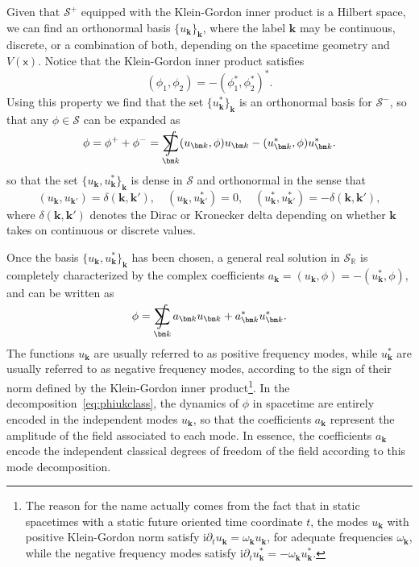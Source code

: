 \documentclass[letterpaper,12pt,titlepage,oneside,final]{book}
\renewcommand{\S}{\mathcal{S}}
\newcommand{\mf}{\mathsf}%
\newcommand{\ii}{\mathrm{i}}
\DeclareMathOperator*{\sumint}{%
\mathchoice%
  {\ooalign{$\displaystyle\sum$\cr\hidewidth$\displaystyle\int$\hidewidth\cr}}
  {\ooalign{\raisebox{.14\height}{\scalebox{.7}{$\textstyle\sum$}}\cr\hidewidth$\textstyle\int$\hidewidth\cr}}
  {\ooalign{\raisebox{.2\height}{\scalebox{.6}{$\scriptstyle\sum$}}\cr$\scriptstyle\int$\cr}}
  {\ooalign{\raisebox{.2\height}{\scalebox{.6}{$\scriptstyle\sum$}}\cr$\scriptstyle\int$\cr}}
}
\begin{document}
Given that $\mathcal{S}^+$ equipped with the Klein-Gordon inner product is a Hilbert space, we can find an orthonormal basis $\{u_{\bm k}\}_{\bm k}$, where the label $\bm k$ may be continuous, discrete, or a combination of both, depending on the spacetime geometry and $V(\mf x)$. Notice that the Klein-Gordon inner product satisfies
\begin{equation}
    (\phi_1,\phi_2) = - (\phi_1^*,\phi_2^*)^*.\label{eq:conjKGinn}
\end{equation}
Using this property we find that the set $\{u_{\bm k}^*\}_{\bm k}$ is an orthonormal basis for $\mathcal{S}^-$, so that any $\phi \in \mathcal{S}$ can be expanded as
\begin{equation}
    \phi = \phi^+ + \phi^- = \sumint_{\bm k} (u_{\bm k},\phi) u_{\bm k}   - (u_{\bm k}^*,\phi)u_{\bm k}^*.
\end{equation}
so that the set $\{u_{\bm k}, u_{\bm k}^*\}_{\bm k}$ is dense in $\S$ and orthonormal in the sense that
\begin{equation}
    (u_{\bm k}, u_{\bm k'}) = \delta(\bm k, \bm k'), \quad  (u_{\bm k}, u_{\bm k'}^*) = 0, \quad  (u_{\bm k}^*, u_{\bm k'}^*) = -\delta(\bm k, \bm k'),
\end{equation}
where $\delta(\bm k, \bm k')$ denotes the Dirac or Kronecker delta depending on whether $\bm k$ takes on continuous or discrete values.

Once the basis $\{u_{\bm k}, u_{\bm k}^*\}_{\bm k}$ has been chosen, a general real solution in $\S_\mathbb{R}$ is completely characterized by the complex coefficients $a_{\bm k} = (u_{\bm k}, \phi) = -(u_{\bm k}^*,\phi)$, and can be written as
\begin{equation}\label{eq:phiukclass}
    \phi = \sumint_{\bm k} a_{\bm k} u_{\bm k}  + a_{\bm k}^*u_{\bm k}^*.
\end{equation}
The functions $u_{\bm k}$ are usually referred to as positive frequency modes, while $u_{\bm k}^*$ are usually referred to as negative frequency modes, according to the sign of their norm defined by the Klein-Gordon inner product\footnote{The reason for the name actually comes from the fact that in static spacetimes with a static future oriented time coordinate $t$, the modes $u_{\bm k}$  with positive Klein-Gordon norm satisfy $\ii \partial_t u_{\bm k} = \omega_{\bm k} u_{\bm k}$, for adequate frequencies $\omega_{\bm k}$, while the negative frequency modes satisfy $\ii \partial_t u_{\bm k}^* = -\omega_{\bm k} u_{\bm k}^*$.}. In the decomposition~\eqref{eq:phiukclass}, the dynamics of $\phi$ in spacetime are entirely encoded in the independent modes $u_{\bm k}$, so that the coefficients $a_{\bm k}$ represent the amplitude of the field associated to each mode. In essence, the coefficients $a_{\bm k}$ encode the independent classical degrees of freedom of the field according to this mode decomposition.
\end{document}
